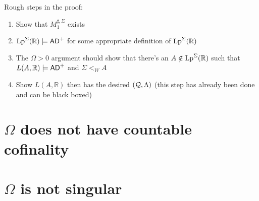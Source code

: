 \documentclass[../../main]{subfiles}
\begin{document}

Rough steps in the proof:
\begin{enumerate}
  \item Show that $M_1^{\sharp,\Sigma}$ exists
  \item $\operatorname{Lp}^\Sigma(\mathbb R)\models\textsf{AD}^+$ for some appropriate
    definition of $\operatorname{Lp}^\Sigma(\mathbb R)$
  \item The $\Omega>0$ argument should show that there's an
    $A\notin\operatorname{Lp}^\Sigma(\mathbb R)$ such that
    $L(A,\mathbb R)\models\textsf{AD}^+$ and $\Sigma <_W A$
  \item Show $L(A,\mathbb R)$ then has the desired $(\operatorname{\mathcal Q},\Lambda)$
    (this step has already been done and can be black boxed)
\end{enumerate}


\section{$\Omega$ does not have countable cofinality}
\lipsum[1]


\section{$\Omega$ is not singular}

\end{document}
